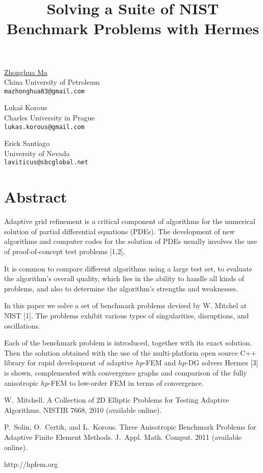 \title{Solving a Suite of NIST Benchmark Problems with Hermes}
\author{} \institute{}
\maketitle

\begin{center}
{\large \underline{Zhonghua Ma}}\\
China University of Petroleum\\
{\tt mazhonghua83@gmail.com}\\
\vspace{4mm}

{\large Luka\v s Korous}\\
Charles University in Prague\\
{\tt lukas.korous@gmail.com}\\
\vspace{4mm}

{\large Erick Santiago}\\
University of Nevada\\
{\tt laviticus@sbcglobal.net}
\end{center}

\section*{Abstract}
Adaptive grid refinement is a critical component of algorithms for the numerical solution of partial differential equations (PDEs). The development of new algorithms and computer codes for the solution of PDEs usually involves the use of proof-of-concept test problems [1,2].

It is common to compare different algorithms using a large test set, to evaluate the algorithm's overall quality, which lies in the ability to handle all kinds of problems, and also to determine the algorithm's strengths and weaknesses.

In this paper we solve a set of benchmark problems devised by W. Mitchel at NIST [1]. The problems exhibit various types of singularities, disruptions, and oscillations.

Each of the benchmark problem is introduced, together with its exact solution. Then the solution obtained with the use of the multi-platform open source C++ library for rapid development of adaptive $hp$-FEM and $hp$-DG solvers {\sc Hermes} [3] is shown, complemented with convergence graphs and comparison of the fully anisotropic $hp$-FEM to low-order FEM in terms of convergence.


\begin{thebibliography}{10}
{\sc W.~Mitchell}. {A Collection of 2D Elliptic Problems for Testing Adaptive Algorithms}. NISTIR 7668, 2010 (available online).

{\sc P.~Solin, O.~Certik, and L.~Korous}. {Three Anisotropic Benchmark Problems for Adaptive Finite Element Methods}. J.~Appl. Math. Comput. 2011 (available online).

{http://hpfem.org}
\end{thebibliography}